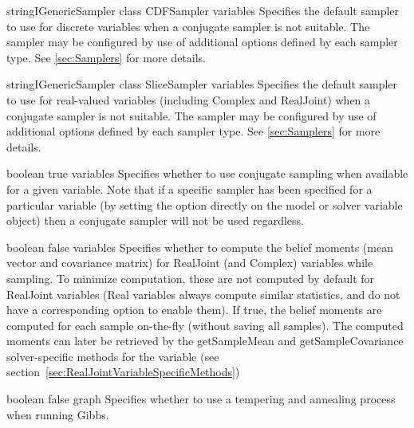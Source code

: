 
{\ifmatlab string\fi \ifjava IGenericSampler class\fi}
{CDFSampler}
{variables}
{Specifies the default sampler to use for discrete variables when a conjugate sampler is not  suitable. The sampler may be configured by use of additional options defined by each sampler type. See \autoref{sec:Samplers} for more details.}


{\ifmatlab string\fi \ifjava IGenericSampler class\fi}
{SliceSampler}
{variables}
{Specifies the default sampler to use for real-valued variables (including Complex and RealJoint) when a conjugate sampler is not suitable. The sampler may be configured by use of additional options defined by each sampler type. See \autoref{sec:Samplers} for more details.}


{boolean}
{true}
{variables}
{Specifies whether to use conjugate sampling when available for a given variable. Note that if a specific sampler has been specified for a particular variable (by setting the  option directly on the model or solver variable object) then a conjugate sampler will not be used regardless.}


{boolean}
{false}
{variables}
{Specifies whether to compute the belief moments (mean vector and covariance matrix) for RealJoint (and Complex) variables while sampling.  To minimize computation, these are not computed by default for RealJoint variables (Real variables always compute similar statistics, and do not have a corresponding option to enable them).  If true, the belief moments are computed for each sample on-the-fly (without saving all samples).  The computed moments can later be retrieved by the getSampleMean and getSampleCovariance solver-specific methods for the variable (see section~\ref{sec:RealJointVariableSpecificMethods})}




{boolean}
{false}
{graph}
{Specifies whether to use a tempering and annealing process when running Gibbs.}

